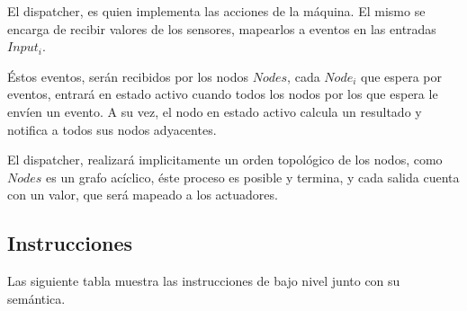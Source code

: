 \begin{enumerate}
El dispatcher, es quien implementa las acciones de la máquina.
El mismo se encarga de recibir valores de los sensores, mapearlos
a eventos en las entradas $Input_i$.

Éstos eventos, serán recibidos por los nodos $Nodes$, cada $Node_i$
que espera por eventos, entrará en estado activo cuando todos los nodos
por los que espera le envíen un evento.
A su vez, el nodo en estado activo calcula un resultado y notifica a
todos sus nodos adyacentes.

El dispatcher, realizará implicitamente un orden topológico de los
nodos, como $Nodes$ es un grafo acíclico, éste proceso es posible y termina, y cada
salida cuenta con un valor, que será mapeado a los actuadores.

\end{enumerate}

\subsection{Instrucciones}

Las siguiente tabla muestra las instrucciones de bajo nivel junto con su semántica.


